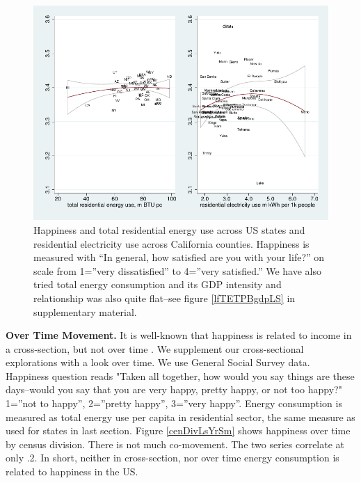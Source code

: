 \documentclass[10pt, letterpaper]{article}
\begin{document}
\begin{spacing}{1.4}
\begin{figure}[H]
 \includegraphics[width=6in]{graphsAndTables/stateCa.pdf}\centering
\caption{Happiness and total residential energy use across US states and
  residential electricity use across   
  California counties. Happiness is measured with ``In general, how satisfied are you with your life?'' on scale from 1=''very dissatisfied'' to 4=''very satisfied.''
We have also tried total energy consumption and its GDP
  intensity and relationship was also quite flat--see figure \ref{lfTETPBgdpLS}
  in supplementary material.}\label{stateCaPAP}
 \end{figure} %

{\bf Over Time Movement.} It is well-known that happiness is related to income
in  a 
cross-section, but not over time \cite{easterlin74,easterlin12}. We
supplement our cross-sectional explorations with a look over time. We use General
Social Survey data.   %
Happiness question reads "Taken all together, how would you say things are
      these days--would you say that you are very happy, pretty happy, or not
      too happy?" 1=''not to happy'', 2=''pretty happy'', 3=''very happy''. 
 Energy consumption is measured as total energy use per capita in
residential sector, the same measure as used for states in last section. 
Figure \ref{cenDivLsYrSm} shows happiness over time by
census division. There is not much co-movement. The two series correlate at only
.2. In short, neither in
cross-section, nor over time energy consumption is related to happiness in
the US. 


\end{spacing}
\end{document}
